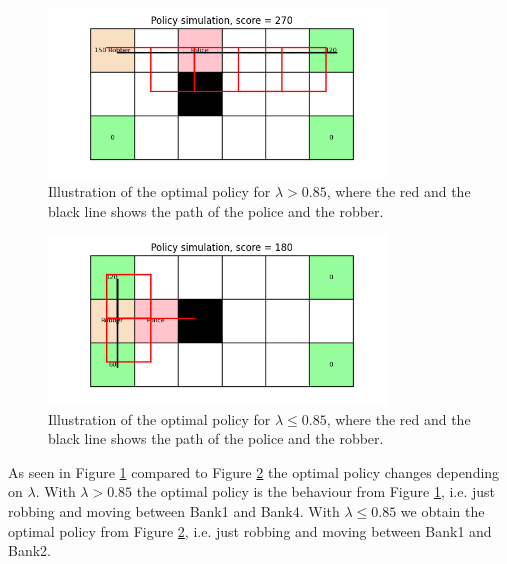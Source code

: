 \documentclass{article}
\begin{document}
\begin{figure}[H]
    \centering
    \includegraphics[width=0.8\textwidth]{Lab_1/images/problem_2/cityRun_ValIter_Nov-25-2020_13-23-59.png}
    \caption{\small Illustration of the optimal policy for $\lambda > 0.85$, where the red and the black line shows the path of the police and the robber. }
    \label{fig:optpol1}
\end{figure}
\begin{figure}[H]
    \centering
    \includegraphics[width=0.8\textwidth]{Lab_1/images/problem_2/cityRun_ValIter_Nov-25-2020_13-29-52.png}
    \caption{\small Illustration of the optimal policy for $\lambda \leq 0.85$, where the red and the black line shows the path of the police and the robber.  }
    \label{fig:optpol2}
\end{figure}

As seen in Figure \ref{fig:optpol1} compared to Figure \ref{fig:optpol2} the optimal policy changes depending on $\lambda$. With $\lambda > 0.85$ the optimal policy is the behaviour from Figure \ref{fig:optpol1}, i.e. just robbing and moving between Bank1 and Bank4. 
With $\lambda \leq 0.85$ we obtain the optimal policy from Figure \ref{fig:optpol2}, i.e. just robbing and moving between Bank1 and Bank2. 
\end{document}

